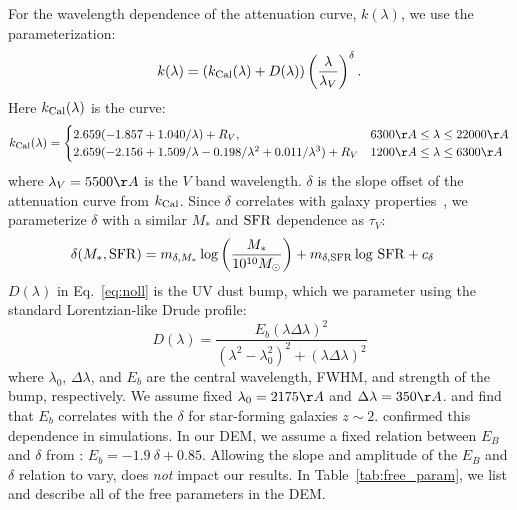For the wavelength dependence of the attenuation curve, $k(\lambda)$, we
use the \cite{noll2009} parameterization: 
\begin{equation} \label{eq:noll}
    k(\lambda) = \left(k_{\rm Cal}(\lambda) + D(\lambda)\right) \left(
    \frac{\lambda}{\lambda_V} \right)^\delta.
\end{equation}
Here $k_{\rm Cal}(\lambda)$ is the \cite{calzetti2001} curve: 
\[
    k_{\rm Cal}(\lambda) = 
    \begin{cases} 
        2.659 (-1.857 + 1.040/\lambda) + R_V, & 6300 \AA \le \lambda \le
        22000 \AA \\ 
        2.659 (-2.156 + 1.509/\lambda - 0.198/\lambda^2 + 0.011/\lambda^3) +
        R_V & 1200 \AA \le \lambda \le 6300 \AA
    \end{cases}
\]
where $\lambda_V = 5500 \AA$ is the $V$ band wavelength. $\delta$ is the slope
offset of the attenuation curve from $k_{\rm Cal}$. Since $\delta$ correlates 
with galaxy properties~\citep[\eg][]{leja2017, salim2018},
we parameterize $\delta$ with a similar $M_*$ and ${\rm SFR}$ dependence as
$\tau_V$:  
\begin{align} \label{eq:delta}
    \delta(M_*, {\rm SFR}) &= m_{\delta,M_*} \log \left(\frac{M_*}{10^{10}
    M_\odot}\right) + m_{\delta,{\rm SFR}} \log\,{\rm SFR} + c_\delta 
\end{align}
$D(\lambda)$ in Eq.~\ref{eq:noll} is the UV dust bump, which we parameter using
the standard Lorentzian-like Drude profile:
\begin{equation}
    D(\lambda) = \frac{E_b(\lambda \Delta \lambda)^2}{(\lambda^2 -
    \lambda_0^2)^2 + (\lambda \Delta \lambda)^2}
\end{equation}
where $\lambda_0$, $\Delta \lambda$, and $E_b$ are the central wavelength,
FWHM, and strength of the bump, respectively. We assume fixed $\lambda_0 = 2175
\AA$ and $\Delta \lambda = 350\AA$. \cite{kriek2013} and \cite{tress2018} find
that $E_b$ correlates with the $\delta$ for star-forming galaxies $z\sim2$.
\cite{narayanan2018} confirmed this dependence in simulations. In our DEM, we
assume a fixed relation between $E_B$ and $\delta$ from \cite{kriek2013}: 
$E_b = -1.9~\delta + 0.85$. Allowing the slope and amplitude of the $E_B$ and
$\delta$ relation to vary, does {\em not} impact our results.
In Table~\ref{tab:free_param}, we list and describe all of the free parameters in the DEM. 

